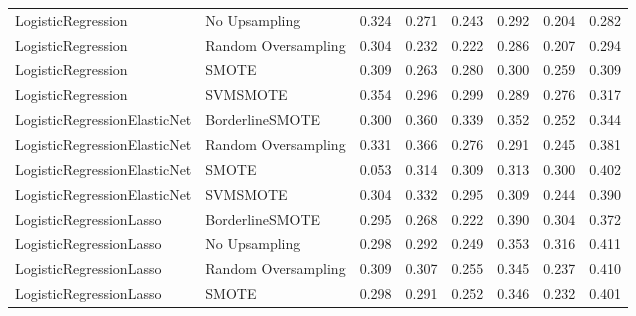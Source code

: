 \begin{tabular}{llllllll}
          LogisticRegression &       No Upsampling & 0.324 &                     0.271 &                 0.243 &                  0.292 &                                   0.204 &     0.282 \\
          LogisticRegression & Random Oversampling & 0.304 &                     0.232 &                 0.222 &                  0.286 &                                   0.207 &     0.294 \\
          LogisticRegression &               SMOTE & 0.309 &                     0.263 &                 0.280 &                  0.300 &                                   0.259 &     0.309 \\
          LogisticRegression &            SVMSMOTE & 0.354 &                     0.296 &                 0.299 &                  0.289 &                                   0.276 &     0.317 \\
LogisticRegressionElasticNet &     BorderlineSMOTE & 0.300 &                     0.360 &                 0.339 &                  0.352 &                                   0.252 &     0.344 \\
LogisticRegressionElasticNet & Random Oversampling & 0.331 &                     0.366 &                 0.276 &                  0.291 &                                   0.245 &     0.381 \\
LogisticRegressionElasticNet &               SMOTE & 0.053 &                     0.314 &                 0.309 &                  0.313 &                                   0.300 &     0.402 \\
LogisticRegressionElasticNet &            SVMSMOTE & 0.304 &                     0.332 &                 0.295 &                  0.309 &                                   0.244 &     0.390 \\
     LogisticRegressionLasso &     BorderlineSMOTE & 0.295 &                     0.268 &                 0.222 &                  0.390 &                                   0.304 &     0.372 \\
     LogisticRegressionLasso &       No Upsampling & 0.298 &                     0.292 &                 0.249 &                  0.353 &                                   0.316 &     0.411 \\
     LogisticRegressionLasso & Random Oversampling & 0.309 &                     0.307 &                 0.255 &                  0.345 &                                   0.237 &     0.410 \\
     LogisticRegressionLasso &               SMOTE & 0.298 &                     0.291 &                 0.252 &                  0.346 &                                   0.232 &     0.401 \\

\end{tabular}
